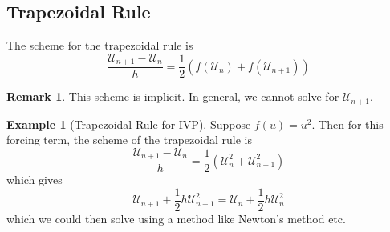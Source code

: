\documentclass[12pt]{article}
\theoremstyle{definition}
\newcommand{\U}{\mathcal{U}}
\newtheorem{example}{\color{WildStrawberry}Example}
\newtheorem{remark}{Remark}
\theoremstyle{definition}
\begin{document}
\subsection{Trapezoidal Rule}
The scheme for the trapezoidal rule is
\begin{equation}
	\frac{\U_{n+1}-\U_n}{h} = \frac{1}{2}\left(f(\U_n) + f(\U_{n+1})\right)
\end{equation}

\begin{remark}
	This scheme is implicit. In general, we cannot solve for $\U_{n+1}$. 
\end{remark}

\begin{example}[Trapezoidal Rule for IVP]
	Suppose $f(u) = u^2$. Then for this forcing term, the scheme of the trapezoidal rule is
	\begin{equation}
		\frac{\U_{n+1}-\U_n}{h} = \frac{1}{2}\left(\U_n^2 + \U_{n+1}^2\right)
	\end{equation}
	which gives
	\begin{equation}
		\U_{n+1} + \frac{1}{2}h\U_{n+1}^2 = \U_{n} + \frac{1}{2}h\U_{n}^2
	\end{equation}
	which we could then solve using a method like Newton's method etc. 
\end{example}
\end{document}

